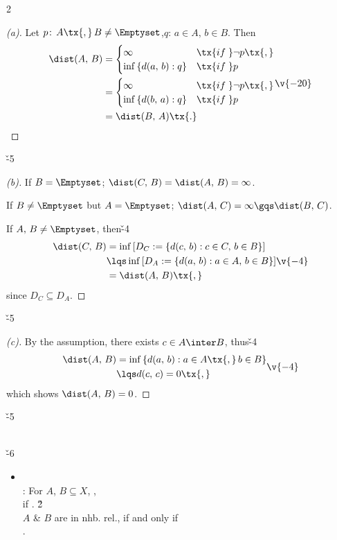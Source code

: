 \documentclass[dvipdfmx,a4paper,titlepage,9pt]{jsarticle}
\begin{document}
\begin{multicols*}{2}
\begin{itemize}[label=-]
\begin{pfbox}
\begin{proof}[(a)]
Let $p\!:\,A\tx{,}\,B\neq\Emptyset$,\;$q\!:\,a\in A,\,b\in B$. Then
$$\begin{aligned}
  \dist(A,\,B)&=\begin{cases}\infty &\tx{if\;}\neg p\tx{,}\\\inf{}\{d(a,\,b):q\} & \tx{if\;}p\end{cases} \\
              &=\begin{cases}\infty &\tx{if\;}\neg p\tx{,}\\\inf{}\{d(b,\,a):q\} & \tx{if\;}p\end{cases}\\
              &=\dist(B,\,A)\tx{.}
  \end{aligned}\v{-20}$$ 
\end{proof}\v{-5}
\dotfill
\begin{proof}[(b)]
If $B=\Emptyset$; $\dist(C,\,B)=\dist(A,\,B)=\infty$.

If $B\neq\Emptyset$ but $A=\Emptyset$; $\dist(A,\,C)=\infty\gqs\dist(B,\,C)$.

If $A,\,B\neq\Emptyset$, then\v{-4}
$$\begin{aligned}
  \dist(C,\,B)&   =\inf{}[D_C:=\{d(c,\,b):c\in C,\,b\in B\}] \\
              &\lqs\inf{}[D_A:=\{d(a,\,b):a\in A,\,b\in B\}] \\
              &   =\dist(A,\,B)\tx{,}
  \end{aligned}\v{-4}$$
since $D_C\subseteq D_A$.
\end{proof}\v{-5}
\dotfill
\begin{proof}[(c)]
By the assumption, there exists $c\in A\inter B$, thus\v{-4}
$$\begin{aligned}
  \dist(A,\,B)&   =\inf{}\{d(a,\,b):a\in A\tx{,}\,b\in B\} \\
              &\lqs d(c,\,c)=0\tx{,}
  \end{aligned}\v{-4}$$
which shows $\dist(A,\,B)=0$.
\end{proof}\v{-5}
\end{pfbox}
\end{itemize} \; \\

\v{-6} 
\begin{itemize}[label=-]
\item{} \\
: For $A$, $B\subseteq X$, , \\
\;\;if . \v2\\
\;\;$A$ \& $B$ are in nhb. \!rel.,\; if and only if\\
\;\;.


\end{itemize}
\end{multicols*}
\end{document}
